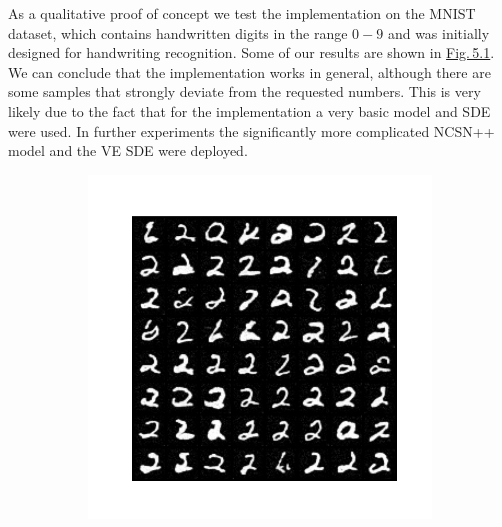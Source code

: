 As a qualitative proof of concept we test the implementation on the MNIST \cite{mnist} dataset, which contains handwritten digits in the range $0-9$ and was initially designed for handwriting recognition. Some of our results are shown in \hyperref[fig:5.1]{Fig.\,5.1}. We can conclude that the implementation works in general, although there are some samples that strongly deviate from the requested numbers. This is very likely due to the fact that for the implementation a very basic model and SDE were used. In further experiments the significantly more complicated NCSN++ model and the VE SDE were deployed.
%
\begin{figure}
    \begin{subfigure}{0.3\textwidth} \label{abb:1a}
        \centering
        \includegraphics[width=\textwidth]{Chapters/figures/experiments/mnist/mnist_2.png}
    \end{subfigure}
    \begin{subfigure}{0.3\textwidth} \label{abb:1a}
        \centering

\end{subfigure}
\end{figure}
